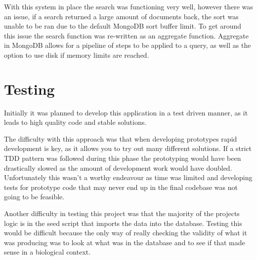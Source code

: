 With this system in place the search was functioning very well, however there was an issue, if a search returned a large amount of documents back, the sort was unable to be ran due to the default MongoDB sort buffer limit. To get around this issue the search function was re-written as an aggregate function. Aggregate\cite{aggregate} in MongoDB allows for a pipeline of steps to be applied to a query, as well as the option to use disk if memory limits are reached. 


% 
% 
% 

\section{Testing}
Initially it was planned to develop this application in a test driven manner, as it leads to high quality code and stable solutions. 

The difficulty with this approach was that when developing prototypes rapid development is key, as it allows you to try out many different solutions. If a strict TDD pattern was followed during this phase the prototyping would have been drastically slowed as the amount of development work would have doubled. Unfortunately this wasn't a worthy endeavour as time was limited and developing tests for prototype code that may never end up in the final codebase was not going to be feasible.

Another difficulty in testing this project was that the majority of the projects logic is in the seed script that imports the data into the database. Testing this would be difficult because the only way of really checking the validity of what it was producing was to look at what was in the database and to see if that made sense in a biological context. 

